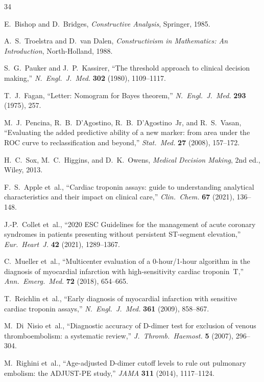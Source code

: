\documentclass[11pt,a4paper]{article}
\theoremstyle{plain}
\theoremstyle{definition}
\begin{document}
\begin{thebibliography}{34}

E.~Bishop and D.~Bridges, \emph{Constructive Analysis}, Springer, 1985.

A.~S.~Troelstra and D.~van Dalen, \emph{Constructivism in Mathematics: An Introduction}, North-Holland, 1988.

S.~G.~Pauker and J.~P.~Kassirer, ``The threshold approach to clinical decision making,'' \emph{N.~Engl.~J.~Med.} \textbf{302} (1980), 1109--1117.

T.~J.~Fagan, ``Letter: Nomogram for Bayes theorem,'' \emph{N.~Engl.~J.~Med.} \textbf{293} (1975), 257.

M.~J.~Pencina, R.~B.~D'Agostino, R.~B.~D'Agostino~Jr, and R.~S.~Vasan, ``Evaluating the added predictive ability of a new marker: from area under the ROC curve to reclassification and beyond,'' \emph{Stat.~Med.} \textbf{27} (2008), 157--172.

H.~C.~Sox, M.~C.~Higgins, and D.~K.~Owens, \emph{Medical Decision Making}, 2nd ed., Wiley, 2013.

F.~S.~Apple et~al., ``Cardiac troponin assays: guide to understanding analytical characteristics and their impact on clinical care,'' \emph{Clin.~Chem.} \textbf{67} (2021), 136--148.

J.-P.~Collet et~al., ``2020 ESC Guidelines for the management of acute coronary syndromes in patients presenting without persistent ST-segment elevation,'' \emph{Eur.~Heart~J.} \textbf{42} (2021), 1289--1367.

C.~Mueller et~al., ``Multicenter evaluation of a 0-hour/1-hour algorithm in the diagnosis of myocardial infarction with high-sensitivity cardiac troponin~T,'' \emph{Ann.~Emerg.~Med.} \textbf{72} (2018), 654--665.

T.~Reichlin et~al., ``Early diagnosis of myocardial infarction with sensitive cardiac troponin assays,'' \emph{N.~Engl.~J.~Med.} \textbf{361} (2009), 858--867.

M.~Di~Nisio et~al., ``Diagnostic accuracy of D-dimer test for exclusion of venous thromboembolism: a systematic review,'' \emph{J.~Thromb.~Haemost.} \textbf{5} (2007), 296--304.

M.~Righini et~al., ``Age-adjusted D-dimer cutoff levels to rule out pulmonary embolism: the ADJUST-PE study,'' \emph{JAMA} \textbf{311} (2014), 1117--1124.


\end{thebibliography}
\end{document}

